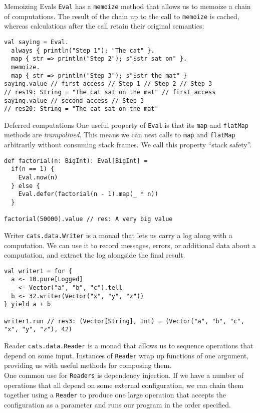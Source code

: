 \documentclass[aspectratio=169]{beamer}
\begin{document}
\begin{frame}[fragile]{Memoizing Evals}
\texttt{Eval} has a \texttt{memoize} method that allows us to memoize a chain of computations. The result of the chain
up to the call to \texttt{memoize} is cached, whereas calculations after the call retain their original
semantics:
\begin{verbatim}
val saying = Eval.
  always { println("Step 1"); "The cat" }.
  map { str => println("Step 2"); s"$str sat on" }.
  memoize.
  map { str => println("Step 3"); s"$str the mat" }
saying.value // first access // Step 1 // Step 2 // Step 3
// res19: String = "The cat sat on the mat" // first access
saying.value // second access // Step 3
// res20: String = "The cat sat on the mat"
\end{verbatim}
\end{frame}

\begin{frame}[fragile]{Deferred computations}
One useful property of \texttt{Eval} is that its \texttt{map} and \texttt{flatMap} methods are
\textit{trampolined}. This means we can nest calls to \texttt{map} and \texttt{flatMap} arbitrarily without consuming stack frames. We call this property “stack safety”.
\begin{verbatim}
def factorial(n: BigInt): Eval[BigInt] =
  if(n == 1) {
    Eval.now(n)
  } else {
    Eval.defer(factorial(n - 1).map(_ * n))
  }

factorial(50000).value // res: A very big value
\end{verbatim}
\end{frame}

\begin{frame}[fragile]{Writer}
\texttt{cats.data.Writer} is a monad that lets us carry a log along with a computation. We can use it to
record messages, errors, or additional data about a computation, and extract the log alongside the
final result.
\bigskip
\begin{verbatim}
val writer1 = for {
  a <- 10.pure[Logged]
  _ <- Vector("a", "b", "c").tell
  b <- 32.writer(Vector("x", "y", "z"))
} yield a + b

writer1.run // res3: (Vector[String], Int) = (Vector("a", "b", "c", "x", "y", "z"), 42)
\end{verbatim}
\end{frame}

\begin{frame}[fragile]{Reader}
\texttt{cats.data.Reader} is a monad that allows us to sequence operations that depend on some input.
Instances of \texttt{Reader} wrap up functions of one argument, providing us with useful methods for
composing them.\bigskip \\
One common use for \texttt{Readers} is dependency injection. If we have a number of operations that all
depend on some external configuration, we can chain them together using a \texttt{Reader} to produce one
large operation that accepts the configuration as a parameter and runs our program in the order
specified.
\end{frame}
\end{document}
